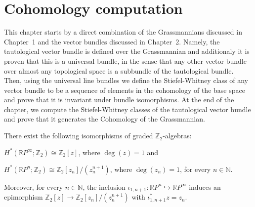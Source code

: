 \chapter{Cohomology computation}
This chapter starts by a direct combination of the Grassmannians discussed in Chapter~1 and the vector bundles discussed in Chapter~2. Namely, the tautological vector bundle is defined over the Grassmannian and additionaly it is proven that this is a universal bundle, in the sense that any other vector bundle over almost any topological space is a subbundle of the tautological bundle. Then, using the universal line bundles we define the Stiefel-Whitney class of any vector bundle to be a sequence of elements in the cohomology of the base space and prove that it is invariant under bundle isomorphisms. At the end of the chapter, we compute the Stiefel-Whitney classes of the tautological vector bundle and prove that it generates the Cohomology of the Grassmannian.

\begin{theorem}\label{thm:projective_spaces_cohomology} There exist the following isomorphisms of graded $\mathbb{Z}_2$-algebras:
\begin{b_item}
\item $H^*(\mathbb{R}P^{\infty};\mathbb{Z}_2)\cong\mathbb{Z}_2[z]$, where $\deg(z)=1$ and
\item $H^*(\mathbb{R}P^n;\mathbb{Z}_2)\cong\mathbb{Z}_2[z_n]/(z_n^{n+1})$, where $\deg(z_n)=1$, for every $n\in\mathbb{N}$.
\end{b_item}
Moreover, for every $n\in\mathbb{N}$, the inclusion $\iota_{1,n+1}:\mathbb{R}P^n\hookrightarrow\mathbb{R}P^{\infty}$ induces an epimorphism $\mathbb{Z}_2[z]\to\mathbb{Z}_2[z_n]/(z_n^{n+1})$ with $\iota_{1,n+1}^*z=z_n$.
\end{theorem}

